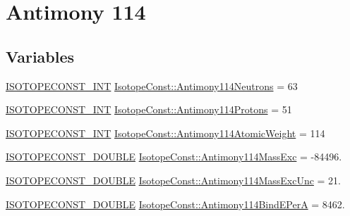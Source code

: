 \hypertarget{group___isotope_const-_antimony-_sb114}{}\section{Antimony 114}
\label{group___isotope_const-_antimony-_sb114}
\subsection*{Variables}
\begin{DoxyCompactItemize}
\item 
\mbox{\hyperlink{group___isotope_const-_macros_ga5f18360b3e99483a35c32d789e62621c}{I\+S\+O\+T\+O\+P\+E\+C\+O\+N\+S\+T\+\_\+\+I\+NT}} \mbox{\hyperlink{group___isotope_const-_antimony-_sb114_gae12c16098d2c1bf56a537751aa3e9746}{Isotope\+Const\+::\+Antimony114\+Neutrons}} = 63
\item 
\mbox{\hyperlink{group___isotope_const-_macros_ga5f18360b3e99483a35c32d789e62621c}{I\+S\+O\+T\+O\+P\+E\+C\+O\+N\+S\+T\+\_\+\+I\+NT}} \mbox{\hyperlink{group___isotope_const-_antimony-_sb114_ga998c15046af1f33997df255175b25a77}{Isotope\+Const\+::\+Antimony114\+Protons}} = 51
\item 
\mbox{\hyperlink{group___isotope_const-_macros_ga5f18360b3e99483a35c32d789e62621c}{I\+S\+O\+T\+O\+P\+E\+C\+O\+N\+S\+T\+\_\+\+I\+NT}} \mbox{\hyperlink{group___isotope_const-_antimony-_sb114_ga6cca920fc3dafefc000ed310f5815b67}{Isotope\+Const\+::\+Antimony114\+Atomic\+Weight}} = 114
\item 
\mbox{\hyperlink{group___isotope_const-_macros_ga8f45a7272ce02c0b4c65c44636ed719a}{I\+S\+O\+T\+O\+P\+E\+C\+O\+N\+S\+T\+\_\+\+D\+O\+U\+B\+LE}} \mbox{\hyperlink{group___isotope_const-_antimony-_sb114_ga7ad0953eb1034e0ec78a81f26be6bcb1}{Isotope\+Const\+::\+Antimony114\+Mass\+Exc}} = -\/84496.
\item 
\mbox{\hyperlink{group___isotope_const-_macros_ga8f45a7272ce02c0b4c65c44636ed719a}{I\+S\+O\+T\+O\+P\+E\+C\+O\+N\+S\+T\+\_\+\+D\+O\+U\+B\+LE}} \mbox{\hyperlink{group___isotope_const-_antimony-_sb114_ga3491ed5fcffb7e650598e82813cc6c0a}{Isotope\+Const\+::\+Antimony114\+Mass\+Exc\+Unc}} = 21.
\item 
\mbox{\hyperlink{group___isotope_const-_macros_ga8f45a7272ce02c0b4c65c44636ed719a}{I\+S\+O\+T\+O\+P\+E\+C\+O\+N\+S\+T\+\_\+\+D\+O\+U\+B\+LE}} \mbox{\hyperlink{group___isotope_const-_antimony-_sb114_ga0297f7f92f24cde47a6c84a5c5d82a6a}{Isotope\+Const\+::\+Antimony114\+Bind\+E\+PerA}} = 8462.
\item 

\end{DoxyCompactItemize}
